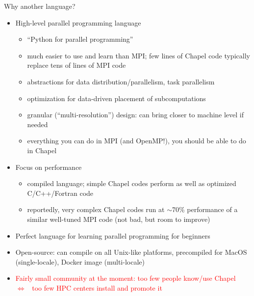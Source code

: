 \documentclass[10pt,xcolor=pdftex,dvipsnames,table]{beamer}
\newcommand{\tc}{\textcolor}
\begin{document}
\begin{frame}{Why another language? }
  \begin{itemize}\setlength{\itemsep}{2mm}
  \item High-level parallel programming language
    \smallskip
    {\let\small\footnotesize \small
      \begin{itemize}\setlength{\itemsep}{0.5mm}
      \item ``Python for parallel programming''
      \item much easier to use and learn than MPI; few lines of Chapel code typically replace tens of lines
        of MPI code
      \item abstractions for data distribution/parallelism, task parallelism
      \item optimization for data-driven placement of subcomputations
      \item granular (``multi-resolution'') design: can bring closer to machine level if needed
      \item everything you can do in MPI (and OpenMP!), you should be able to do in Chapel
    \end{itemize}}
  \item Focus on performance
    \smallskip
    {\let\small\footnotesize \small
      \begin{itemize}\setlength{\itemsep}{0.5mm}
      \item compiled language; simple Chapel codes perform as well as optimized C/C++/Fortran code
      \item reportedly, very complex Chapel codes run at $\sim$70\% performance of a similar well-tuned
        MPI code (not bad, but room to improve)
    \end{itemize}}
  \item Perfect language for learning parallel programming for beginners
  \item Open-source: can compile on all Unix-like platforms, precompiled for MacOS (single-locale),
    Docker image (multi-locale)
  \item \tc{red}{Fairly small community at the moment: too few people know/use Chapel
    ~$\Longleftrightarrow$~ too few HPC centers install and promote it}
  \end{itemize}
\end{frame}
\end{document}
